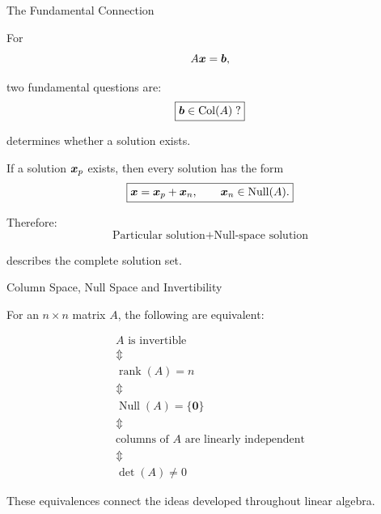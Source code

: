 \begin{frame}{The Fundamental Connection}

For
\vspace{-0.1cm}
\[
A\bm{x}=\bm{b},
\]

two fundamental questions are:
\vspace{-0.1cm}
\[
\boxed{
\bm{b}\in\operatorname{Col}(A)\;?
}
\]

determines whether a solution exists.

If a solution $\bm{x}_p$ exists, then every solution has the form
\vspace{-0.1cm}
\[
\boxed{
\bm{x}
=
\bm{x}_p+\bm{x}_n,
\qquad
\bm{x}_n\in\operatorname{Null}(A).
}
\]

Therefore:
\vspace{-0.1cm}
\[
\boxed{
\text{Particular solution}
+
\text{Null-space solution}
}
\]

describes the complete solution set.

\end{frame}



\begin{frame}{Column Space, Null Space and Invertibility}

For an $n\times n$ matrix $A$, the following are equivalent:

\[
\boxed{
\begin{array}{c}
A\text{ is invertible}\\
\Updownarrow\\
\operatorname{rank}(A)=n\\
\Updownarrow\\
\operatorname{Null}(A)=\{\mathbf{0}\}\\
\Updownarrow\\
\text{columns of }A\text{ are linearly independent}\\
\Updownarrow\\
\det(A)\neq0
\end{array}
}
\]

These equivalences connect the ideas developed throughout
linear algebra.

\end{frame}